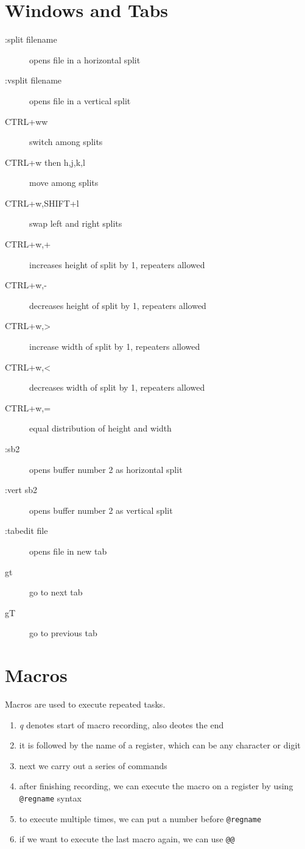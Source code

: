 \documentclass[a4paper, 12pt]{article}
\begin{document}
\section{Windows and Tabs}
\begin{description}
	\item[:split filename] opens file in a horizontal split
	\item[:vsplit filename] opens file in a vertical split
	\item[CTRL+ww] switch among splits
	\item[CTRL+w then h,j,k,l] move among splits
	\item[CTRL+w,SHIFT+l] swap left and right splits
	\item[CTRL+w,+] increases height of split by 1, repeaters allowed
	\item[CTRL+w,-] decreases height of split by 1, repeaters allowed
	\item[CTRL+w,\textgreater] increase width of split by 1, repeaters allowed
	\item[CTRL+w,\textless] decreases width of split by 1, repeaters allowed
	\item[CTRL+w,=] equal distribution of height and width
	\item[:sb2] opens buffer number 2 as horizontal split
	\item[:vert sb2] opens buffer number 2 as vertical split
	\item[:tabedit file] opens file in new tab
	\item[gt] go to next tab
	\item[gT] go to previous tab
\end{description}

\section{Macros}
Macros are used to execute repeated tasks.
\begin{enumerate}
	\item \emph{q} denotes start of macro recording, also deotes the end	
	\item it is followed by the name of a register, which can be any character or digit
	\item next we carry out a series of commands
	\item after finishing recording, we can execute the macro on a register by using \verb|@regname| syntax
	\item to execute multiple times, we can put a number before \verb|@regname|
	\item if we want to execute the last macro again, we can use \verb|@@|
\end{enumerate}
\end{document}
